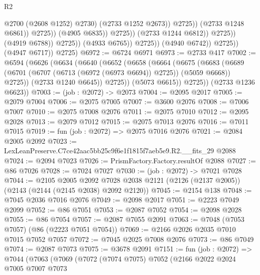 \begin{lexlean}{R2}
\begin{coremodule}
                                                    @2700
                                                    (@2608 @1252)
                                                    @2730)
                                                  (@2733 @1252 @2673))
                                                @2725))
                                            (@2733 @1248 @6861))
                                          @2725))
                                      (@4905 @6835))
                                    @2725))
                                (@2733 @1244 @6812))
                              @2725))
                          (@4919 @6788))
                        @2725))
                    (@4933 @6765))
                  @2725))
              (@4940 @6742))
            @2725))
        (@4947 @6717))
      @2725)
@6972 := @6724 @6971
@6973 := @2733 @417
@7002 := @6594
    (@6626
      (@6634
        (@6640
          (@6652
            (@6658
              (@6664
                (@6675
                  (@6683
                    (@6689 (@6701 (@6707 (@6713 (@6972 (@6973 @6694)) @2725)) (@5059 @6668)) @2725))
                  (@2733 @1240 @6645))
                @2725))
            (@5073 @6615))
          @2725))
      (@2733 @1236 @6623))
@7003 := (job : @2072) -> @2073
@7004 := @2095 @2017
@7005 := @2079 @7004
@7006 := @2075 @7005
@7007 := @3600 @2076
@7008 := @7006 @7007
@7010 := @2075 @7008 @2076
@7011 := @2075 @7010
@7012 := @2095 @2028
@7013 := @2079 @7012
@7015 := @2075 @7013 @2076
@7016 := @7011 @7015
@7019 := fun (job : @2072) => @2075 @7016 @2076
@7021 := @2084 @2005 @2092
@7023 := LexLeanPreserve.C7ce42aac5bb25c9f6e1f1815f7aeb5e9.R2.__fits_29 @2088
@7024 := @2094 @7023
@7026 := PrismFactory.Factory.resultOf @2088
@7027 := @86 @7026
@7028 := @7024 @7027
@7030 := (job : @2072) -> @7021 @7028
@7044 := @2105
    @2005
    @2092
    @7028
    @2038
    @2121
    (@2126 (@2137 @2005))
    (@2143 (@2144 (@2145 @2038) @2092 @2120))
@7045 := @2154 @138
@7048 := @7045 @2036 @7016 @2076
@7049 := @2098 @2017
@7051 := @2223 @7049 @2099
@7052 := @86 @7051
@7053 := @2087 @7052
@7054 := @2098 @2028
@7055 := @86 @7054
@7057 := @2087 @7055 @2091
@7063 := @7048 (@7053 @7057) (@86 (@2223 @7051 @7054))
@7069 := @2166 @2026 @2035 @7010 @7015 @7052 @7057
@7072 := @7045 @2025 @7008 @2076
@7073 := @86 @7049
@7074 := @2087 @7073
@7075 := @3678 @2091
@7151 := fun (job : @2072) =>
  @7044
    (@7063
      (@7069
        (@7072
          (@7074 @7075)
          @7052
          (@2166
            @2022
            @2024
            @7005
            @7007
            @7073

\end{coremodule}
\end{lexlean}
